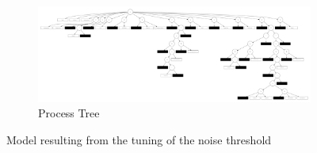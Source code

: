 \documentclass[12pt]{report}
\begin{document}
\begin{figure}[h]
\begin{subfigure}[b]{0.7\textwidth}
        \centering
	\includegraphics[width=\textwidth]{figures/q1_d_noise_threshold_tuning.pdf}
        \caption{Process Tree}
        \label{fig:q1_d_noise_threshold_tuninig-pdf}
    \end{subfigure}
    \hfill
    \caption{Model resulting from the tuning of the noise threshold}
    \label{fig:noise-threshold-tuning-model}
\end{figure}
\end{document}
